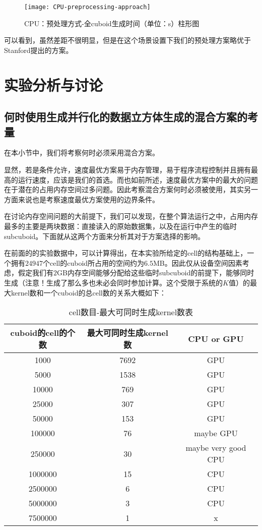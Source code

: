 \begin{figure}[ht]
\centering
\texttt{[image: CPU-preprocessing-approach]}
\caption{CPU：预处理方式-全cuboid生成时间（单位：s）柱形图} 
\label{fig:figure8}
\end{figure}

可以看到，虽然差距不很明显，但是在这个场景设置下我们的预处理方案略优于Stanford提出的方案。

\section{实验分析与讨论}

\subsection{何时使用生成并行化的数据立方体生成的混合方案的考量}
在本小节中，我们将考察何时必须采用混合方案。

显然，若是条件允许，速度最优方案易于内存管理，易于程序流程控制并且拥有最高的运行速度，应该是我们的首选。而也如前所述，速度最优方案中的最大的问题在于潜在的占用内存空间过多问题。因此考察混合方案何时必须被使用，其实另一方面来说也是考察速度最优方案使用的边界条件。

在讨论内存空间问题的大前提下，我们可以发现，在整个算法运行之中，占用内存最多的主要是两块数据：直接读入的原始数据集，以及在运行中产生的临时subcuboid。下面就从这两个方面来分析其对于方案选择的影响。

在前面的的实验数据中，可以计算得出，在本实验所给定的cell的结构基础上，一个拥有$24947$个cell的cuboid所占用的空间约为$6.5$MB。因此仅从设备空间因素考虑，假定我们有$2$GB内存空间能够分配给这些临时subcuboid的前提下，能够同时生成（注意！生成了那么多也未必会同时参加计算。这个受限于系统的$K$值）的最大kernel数和一个cuboid的总cell数的关系大概如下：

\begin{table}[!htbp]
\centering
\caption{cell数目-最大可同时生成kernel数表} 
\label{tab:table19}
\begin{tabular}{|c|c|c|}
    \hline
    cuboid的cell的个数 & 最大可同时生成kernel数 & CPU or GPU\\
    \hline
    1000 & 7692 & GPU\\
    \hline
    5000 & 1538 & GPU\\
    \hline
    10000 & 769 & GPU\\
    \hline
    25000 & 307 & GPU\\
    \hline
    50000 & 153 & GPU\\
    \hline
    100000 & 76 & maybe GPU\\
    \hline
    250000 & 30 & maybe very good CPU\\
    \hline
    1000000 & 15 & CPU\\
    \hline
    2500000 & 6 & CPU\\
    \hline
    5000000 & 3 & CPU\\
    \hline
    7500000 & 1 & x\\
    \hline
\end{tabular}
\end{table}

